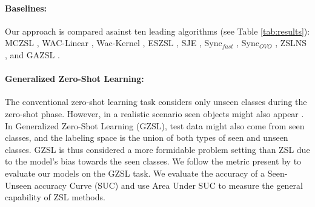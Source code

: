 \documentclass[11pt,a4paper]{article}
\begin{document}
\paragraph{Baselines:}  
Our approach is compared asainst ten leading algorithms (see Table \ref{tab:results}): MCZSL \citep{akata2016multi}, WAC-Linear  \citep{elhoseiny2013write}, Wac-Kernel   \citep{elhoseiny2016write}, ESZSL     \citep{romera2015embarrassingly}, SJE   \citep{akata2015evaluation}, Sync$_{fast}$ \citep{changpinyo2016synthesized}, Sync$_{OVO}$ \citep{changpinyo2016synthesized},
ZSLNS \citep{qiao2016less}, and GAZSL \citep{zhu2018generative}. 


\paragraph{Generalized Zero-Shot Learning:} 
The conventional zero-shot learning task considers only unseen classes during the zero-shot phase. However, in a realistic scenario seen objects might also appear \cite{chao2016empirical}. In Generalized Zero-Shot Learning (GZSL), test data might also come from seen classes, and the labeling space is the union of both types of seen and unseen classes. GZSL is thus considered a more formidable problem setting
than ZSL due to the model's bias towards the seen classes.
We follow the metric present by \citet{chao2016empirical} to evaluate our models on the GZSL task. We evaluate the accuracy of a Seen-Unseen accuracy Curve (SUC) and use Area Under  SUC to measure the general capability of ZSL methods.
\end{document}
